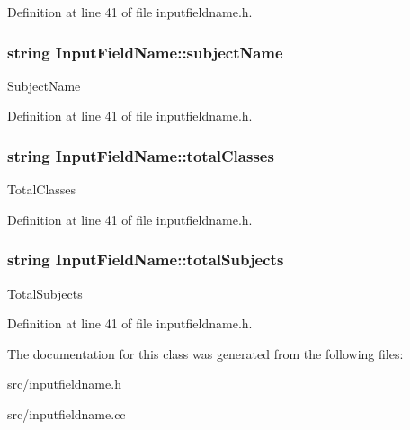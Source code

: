 Definition at line 41 of file inputfieldname.\-h.

\hypertarget{classInputFieldName_a0614731b959afef6bb00f9fc957e7521}{
\subsubsection[{subject\-Name}]{\setlength{\rightskip}{0pt plus 5cm}string Input\-Field\-Name\-::subject\-Name}}\label{classInputFieldName_a0614731b959afef6bb00f9fc957e7521}
Subject\-Name 

Definition at line 41 of file inputfieldname.\-h.

\hypertarget{classInputFieldName_a5bf413dee6dcf29c1872e93f150d48c0}{
\subsubsection[{total\-Classes}]{\setlength{\rightskip}{0pt plus 5cm}string Input\-Field\-Name\-::total\-Classes}}\label{classInputFieldName_a5bf413dee6dcf29c1872e93f150d48c0}
Total\-Classes 

Definition at line 41 of file inputfieldname.\-h.

\hypertarget{classInputFieldName_ac58130077f39d82aaf447b1a67e9f70f}{
\subsubsection[{total\-Subjects}]{\setlength{\rightskip}{0pt plus 5cm}string Input\-Field\-Name\-::total\-Subjects}}\label{classInputFieldName_ac58130077f39d82aaf447b1a67e9f70f}
Total\-Subjects 

Definition at line 41 of file inputfieldname.\-h.



The documentation for this class was generated from the following files\-:\begin{DoxyCompactItemize}
\item 
src/inputfieldname.\-h\item 
src/inputfieldname.\-cc\end{DoxyCompactItemize}
